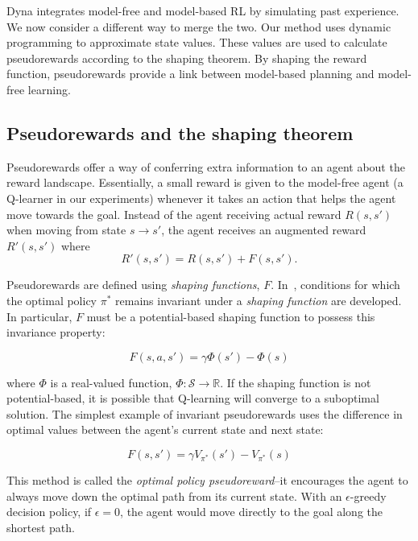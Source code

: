 \documentclass[letterpaper]{article}
\begin{document}
Dyna integrates model-free and model-based RL by simulating past experience. We now consider a different way to merge the two. Our method uses dynamic programming to approximate state values. These values are used to calculate pseudorewards according to the shaping theorem. By shaping the reward function, pseudorewards provide a link between model-based planning and model-free learning.

\subsection{Pseudorewards and the shaping theorem}

Pseudorewards offer a way of conferring extra information to an agent about the reward landscape. Essentially, a small reward is given to the model-free agent (a Q-learner in our experiments) whenever it takes an action that helps the agent move towards the goal. Instead of the agent receiving actual reward $R(s, s')$ when moving from state $s \rightarrow s'$, the agent receives an augmented reward $R'(s, s')$ where
\begin{equation}
R'(s, s') = R(s, s') + F(s, s').
\end{equation} 

Pseudorewards are defined using \textit{shaping functions}, $F$.  In~\cite{ng1999policy}, conditions for which the optimal policy $\pi^*$ remains invariant under a \textit{shaping function} are developed. In particular, $F$ must be a potential-based shaping function to possess this invariance property:

\begin{equation}
F(s, a,s') = \gamma \Phi(s') - \Phi(s) 
\end{equation}

\noindent
where $\Phi$ is a real-valued function, $\Phi : \mathcal{S} \rightarrow \mathbb{R}$. If the shaping function is not potential-based, it is possible that Q-learning will converge to a suboptimal solution. The simplest example of invariant pseudorewards uses the difference in optimal values between the agent's current state and next state:

\begin{equation}
F(s, s') = \gamma V_{\pi^*}(s') - V_{\pi^*}(s) 
\end{equation}

This method is called the \textit{optimal policy pseudoreward}--it encourages the agent to always move down the optimal path from its current state. With an $\epsilon$-greedy decision policy, if $\epsilon = 0$, the agent would move directly to the goal along the shortest path.
\end{document}
